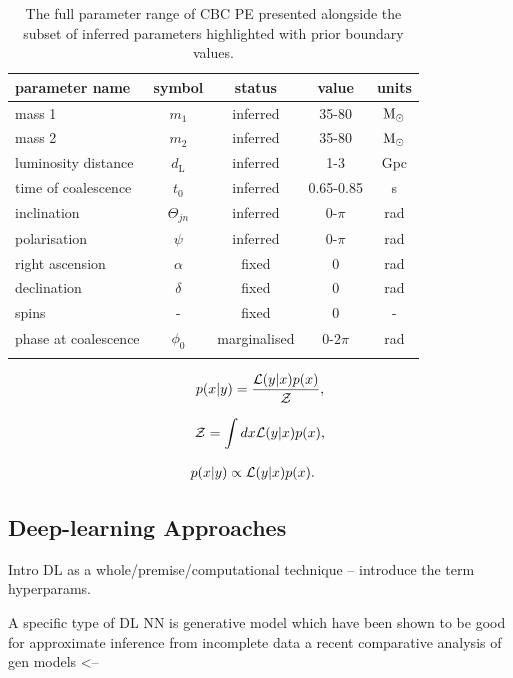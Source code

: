 \documentclass[aps,superscriptaddress,twocolumn,nopreprintnumbers,floatfix,groupedaddress]{revtex4-1}
\begin{document}
%
\begin{table}[t]
	\centering
	\caption{The full parameter range of CBC PE presented alongside the subset of inferred parameters highlighted with prior boundary values.}
	\begin{tabular}[t]{lcccc}
		\toprule
		parameter name & symbol & status & value & units\\
		\hline
		mass 1 & $m_1$ & inferred  & 35-80 & \(\textup{M}_\odot\)\\
		mass 2 & $m_2$ & inferred & 35-80 & \(\textup{M}_\odot\)\\
		luminosity distance & $d_{\text{L}}$ & inferred & 1-3 & Gpc\\
		time of coalescence & $t_{0}$ & inferred & 0.65-0.85 & s\\
		inclination & $\Theta_{jn}$ & inferred & 0-$\pi$ & rad\\
		polarisation & $\psi$ & inferred & 0-$\pi$ & rad\\
		\hline
		right ascension & $\alpha$ & fixed & 0 & rad\\
		declination & $\delta$ & fixed & 0 & rad\\
		spins & - & fixed & 0 & -\\
		\hline
		phase at coalescence & $\phi_{0}$ & marginalised & 0-$2\pi$ & rad\\
		\botrule
	\end{tabular}
	\label{tab:params}
\end{table}
%
%
%
\begin{align}\label{eq:bayes_exact} 
	p(x|y) = \frac{{\cal L}(y|x) p(x)}{\cal Z} ,
\end{align}

\begin{align}\label{eq:bayes_evidence} 
{\cal Z} = \int dx {\cal L}(y|x) p(x) ,
\end{align}

\begin{align}\label{eq:bayes_prop} 
	p(x|y) &\propto {\cal L}(y|x) p(x). 
\end{align}


%
%
%
%
\subsection{Deep-learning Approaches}

Intro DL as a whole/premise/computational technique – introduce the term hyperparams.

A specific type of DL NN is generative model which have been shown to be good for approximate inference from incomplete data \cite{1807.03653,bond2021deep} a recent comparative analysis of gen models <--
\end{document}
